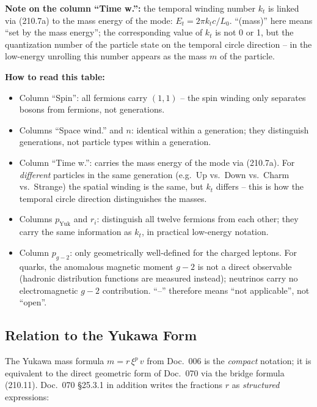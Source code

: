 \textbf{Note on the column \enquote{Time w.}:} the temporal winding
number $k_t$ is linked via (210.7a) to the mass energy of the mode:
$E_t = 2\pi k_t c / L_0$. \enquote{(mass)} here means \enquote{set
by the mass energy}; the corresponding value of $k_t$ is not 0 or 1,
but the quantization number of the particle state on the temporal
circle direction -- in the low-energy unrolling this number appears
as the mass $m$ of the particle.

\textbf{How to read this table:}
\begin{itemize}
  \item Column \enquote{Spin}: all fermions carry $(1,1)$ -- the spin
        winding only separates bosons from fermions, not generations.
  \item Columns \enquote{Space wind.} and $n$: identical within a
        generation; they distinguish generations, not particle types
        within a generation.
  \item Column \enquote{Time w.}: carries the mass energy of the mode
        via (210.7a). For \emph{different} particles in the same
        generation (e.g.\ Up vs.\ Down vs.\ Charm vs.\ Strange) the
        spatial winding is the same, but $k_t$ differs -- this is
        how the temporal circle direction distinguishes the masses.
  \item Columns $p_{\text{Yuk}}$ and $r_i$: distinguish all twelve
        fermions from each other; they carry the same information as
        $k_t$, in practical low-energy notation.
  \item Column $p_{g\!-\!2}$: only geometrically well-defined for
        the charged leptons. For quarks, the anomalous magnetic
        moment $g\!-\!2$ is not a direct observable (hadronic
        distribution functions are measured instead); neutrinos
        carry no electromagnetic $g\!-\!2$ contribution.
        \enquote{--} therefore means \enquote{not applicable}, not
        \enquote{open}.
\end{itemize}

\subsection*{Relation to the Yukawa Form}

The Yukawa mass formula $m = r\,\xi^p\,v$ from Doc.~006 is the
\emph{compact} notation; it is equivalent to the direct geometric form
of Doc.~070 via the bridge formula (210.11). Doc.~070 §25.3.1 in
addition writes the fractions $r$ as \emph{structured} expressions:

